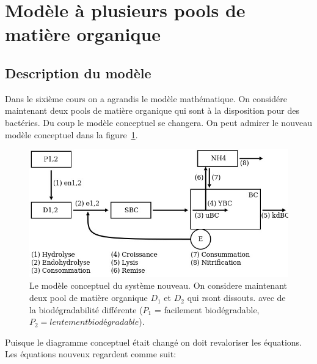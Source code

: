 \newpage
\section{Mod\`ele \`a plusieurs pools de matière organique}
\subsection{Description du mod\`ele}

\par{
Dans le sixième cours on a agrandis le modèle mathématique. On considére maintenant deux pools de
matière organique qui sont à la disposition pour des bact\'eries. Du coup le modèle conceptuel se changera.
On peut admirer le nouveau modèle conceptuel dans la figure~\ref{fig:partie2diagconc}.
}

\begin{figure}[h!]
  \includegraphics[width=\textwidth]{partie2/scan1.jpg}
  \caption{Le modèle conceptuel du système nouveau. On considere maintenant deux pool de matière organique
$D_1$ et $D_2$ qui rsont dissouts.
 avec de la biodégradabilité différente ($P_1$ = facilement biodégradable, $P_2=lentement biodégradable$).
\todo}
  \label{fig:partie2diagconc}
\end{figure}

\par{
Puisque le diagramme conceptuel était changé on doit revaloriser les équations. Les
équations nouveux regardent comme suit:
}

